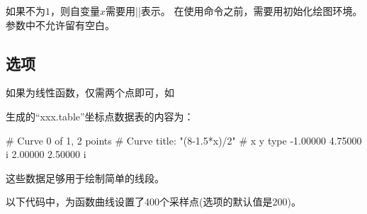 \documentclass[../main.tex]{subfiles}
\begin{document}
\tkzBomb 如果不为$1$，则自变量$x$需要用|\x|表示。
\tkzHand 在使用命令之前，需要用初始化绘图环境。
\tkzBomb 参数中不允许留有空白。
\subsection{选项}

如果为线性函数，仅需两个点即可，如

\begin{tkzltxexample}[]
\end{tkzltxexample}


生成的\enquote{xxx.table}坐标点数据表的内容为：

\begin{tkzltxexample}[]
# Curve 0 of 1, 2 points
# Curve title: "(8-1.5*x)/2"
# x y type
-1.00000 4.75000  i
2.00000 2.50000  i
\end{tkzltxexample}

这些数据足够用于绘制简单的线段。

以下代码中，为函数曲线设置了400个采样点(选项的默认值是200)。

\medskip
\begin{tkzexample}[latex=7cm]
\end{tkzexample}

\end{document}
